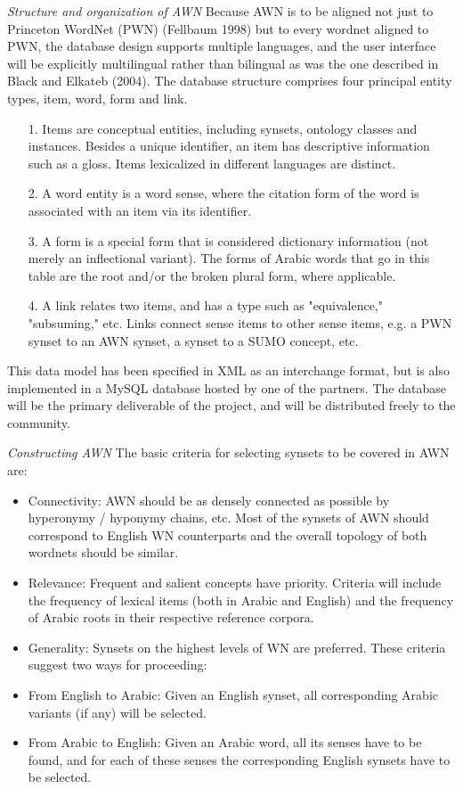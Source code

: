\textit{Structure and organization of AWN}
Because AWN is to be aligned not just to Princeton WordNet (PWN) (Fellbaum 1998) but to every wordnet aligned to PWN, the database design supports multiple languages, and the user interface will be explicitly multilingual rather than bilingual as was the one described in Black and Elkateb (2004).
The database structure comprises four principal entity types, item, word, form and link.
\begin{itemize}
\item [1.] Items are conceptual entities, including synsets, ontology classes and instances. Besides a unique identifier, an item has descriptive information such as a gloss. Items lexicalized in different languages are distinct.
\item [2.]A word entity is a word sense, where the citation form of the word is associated with an item via its identifier.
\item [3.]A form is a special form that is considered dictionary information (not merely an inflectional variant). The forms of Arabic words that go in this table are the root and/or the broken plural form, where applicable.
\item [4.]A link relates two items, and has a type such as "equivalence," "subsuming," etc. Links connect sense items to other sense items, e.g. a PWN synset to an AWN synset, a synset to a SUMO concept, etc.
\end{itemize}
This data model has been specified in XML as an interchange format, but is also implemented in a MySQL database hosted by one of the partners. The database will be the primary deliverable of the project, and will be distributed freely to the community.

\textit{Constructing AWN}
The basic criteria for selecting synsets to be covered in AWN are: 
\begin{itemize}
\item Connectivity: AWN should be as densely connected as possible by hyperonymy / hyponymy chains, etc. Most of the synsets of AWN should correspond to English WN counterparts and the overall topology of both wordnets should be similar.
\item Relevance: Frequent and salient concepts have priority. Criteria will include the frequency of lexical items (both in Arabic and English) and the frequency of Arabic roots in their respective reference corpora.
\item Generality: Synsets on the highest levels of WN are preferred. These criteria suggest two ways for proceeding:
\item From English to Arabic: Given an English synset, all corresponding Arabic variants (if any) will be selected.
\item From Arabic to English: Given an Arabic word, all its senses have to be found, and for each of these senses the corresponding English synsets have to be selected.
\end{itemize}

